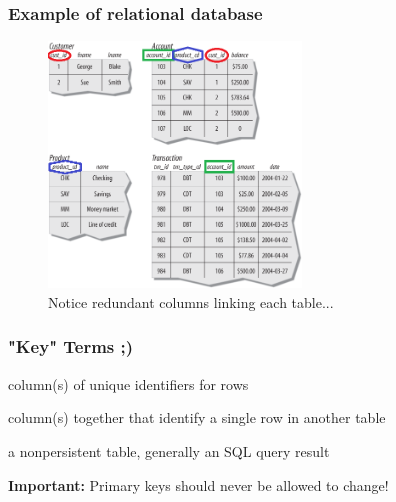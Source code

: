 \documentclass{beamer}
\begin{document}
\begin{frame}
\frametitle{Example of relational database}
\begin{figure}
	\includegraphics[width=0.6\textwidth]{Figures/figure1-3.png}
	\caption{Notice redundant columns linking each table...}
\end{figure}
\end{frame}

\begin{frame}
\frametitle{"Key" Terms ;)}

\begin{description}[align=left]
	\item[primary key] column(s) of unique identifiers for rows
	\item[foreign key] column(s) together that identify a single row in another table
	\item[result set] a nonpersistent table, generally an SQL query result

\end{description}

\vspace*{1em}

\textbf{Important:} Primary keys should never be allowed to change!
\end{frame}
\end{document}
